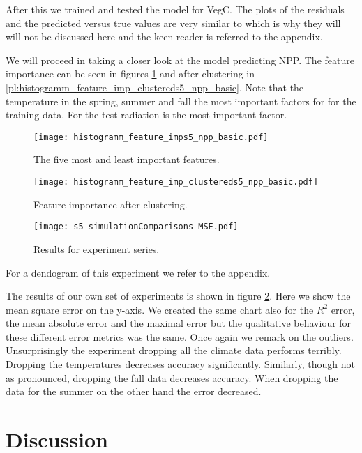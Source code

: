 After this we trained and tested the model for VegC.
The plots of the residuals and the predicted versus true values are very similar to  which is why
they will will not be discussed here and the keen reader is referred to the appendix.

We will proceed in taking a closer look at the model predicting NPP.
The feature importance can be seen in figures \ref{pl:histogramm_feature_imps5_npp_basic} and after clustering in
\ref{pl:histogramm_feature_imp_clustereds5_npp_basic}.
Note that the temperature in the spring, summer and fall the most important factors for
for the training data. For the test radiation is the most important factor.
\begin{figure}[h]
  \centering
  \texttt{[image: histogramm\_feature\_imps5\_npp\_basic.pdf]}
  \caption{The five most and least important features.}
  \label{pl:histogramm_feature_imps5_npp_basic}
\end{figure}
\begin{figure}[h]
  \centering
  \begin{minipage}{0.45\textwidth}
    \centering
    \texttt{[image: histogramm\_feature\_imp\_clustereds5\_npp\_basic.pdf]}
    \caption{Feature importance after clustering.}
    \label{pl:histogramm_feature_imp_clustereds5_npp_basic}
  \end{minipage}
  \hfill
  \begin{minipage}{0.45\textwidth}
    \centering
    \texttt{[image: s5\_simulationComparisons\_MSE.pdf]}
    \caption{Results for experiment series.}
    \label{pl:s5_simulationComparisons_MSE}
  \end{minipage}
\end{figure}
For a dendogram of this experiment we refer to the appendix.

The results of our own set of experiments is shown in figure \ref{pl:s5_simulationComparisons_MSE}. Here we show the mean square error
on the y-axis. We created the same chart also for the $R^2$ error, the mean absolute error and the maximal error but the qualitative behaviour
for these different error metrics was the same.
Once again we remark on the outliers.
Unsurprisingly the experiment dropping all the climate data performs terribly.
Dropping the temperatures decreases accuracy significantly. Similarly,
though not as pronounced, dropping the fall data decreases accuracy.
When dropping the data for the summer on the other hand the error decreased.

\section{Discussion}


